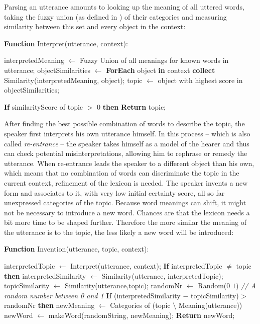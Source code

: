  Parsing an utterance amounts to looking
up the meaning of all uttered words, taking the fuzzy union (as
defined in \citealp{zadeh65fuzzy}) of their categories and measuring
similarity between this set and every object in the context:

\begin{verbatim+}
\textbf{Function} Interpret(utterance, context):

interpretedMeaning 
    $\leftarrow$ Fuzzy Union of all meanings for known words in utterance;
objectSimilarities 
    $\leftarrow$ \textbf{ForEach} object \textbf{in} context 
                     \textbf{collect} Similarity(interpretedMeaning, object);
topic $\leftarrow$ object with highest score in objectSimilarities;

\textbf{If} similarityScore of topic $>$ 0
    \textbf{then} \textbf{Return} topic;
\end{verbatim+}

 After finding the best possible combination of
words to describe the topic, the speaker first interprets his own
utterance himself. In this process -- which is also called
\emph{re-entrance} \citep{steels03re-entrance} -- the speaker takes
himself as a model of the hearer and thus can check potential
misinterpretations, allowing him to rephrase or remedy the
utterance. When re-entrance leads the speaker to a different object
than his own, which means that no combination of words can
discriminate the topic in the current context, refinement of the
lexicon is needed.  The speaker invents a new form and associates to
it, with very low initial certainty score, all so far unexpressed
categories of the topic. Because word meanings can shift, it might not
be necessary to introduce a new word. Chances are that the lexicon
needs a bit more time to be shaped further. Therefore the more similar
the meaning of the utterance is to the topic, the less likely a new
word will be introduced:

\begin{verbatim+}
\textbf{Function} Invention(utterance, topic, context):

interpretedTopic $\leftarrow$ Interpret(utterance, context);
\textbf{If} interpretedTopic $\neq$ topic
\textbf{then}
    interpretedSimilarity $\leftarrow$ Similarity(utterance, interpretedTopic);
    topicSimilarity $\leftarrow$ Similarity(utterance,topic);
    randomNr $\leftarrow$ Random($0$ $1$) \textit{// A random number between 0 and 1}
    \textbf{If} (interpretedSimilarity $-$ topicSimilarity) > randomNr
    \textbf{then} 
        newMeaning $\leftarrow$ Categories of (topic $\setminus$  Meaning(utterance)) 
        newWord $\leftarrow$ makeWord(randomString, newMeaning);
        \textbf{Return} newWord;
\end{verbatim+}



